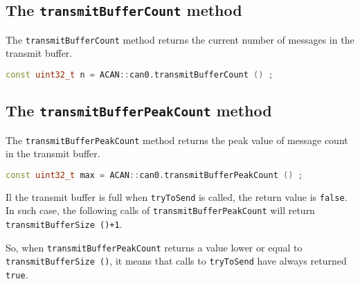 \documentclass[10pt, a4paper, obeyspaces, openany]{extarticle}
\begin{document}
\subsection{The \texttt{transmitBufferCount} method}

The \texttt{transmitBufferCount} method returns the current number of messages in the transmit buffer.
{ \small\begin{lstlisting}[language=c++]
const uint32_t n = ACAN::can0.transmitBufferCount () ;
\end{lstlisting}}


\subsection{The \texttt{transmitBufferPeakCount} method}

The \texttt{transmitBufferPeakCount} method returns the peak value of message count in the transmit buffer.
{ \small\begin{lstlisting}[language=c++]
const uint32_t max = ACAN::can0.transmitBufferPeakCount () ;
\end{lstlisting}}

Il the transmit buffer is full when \texttt{tryToSend} is called, the return value is \texttt{false}. In such case, the following calls of \texttt{transmitBufferPeakCount} will return \texttt{transmitBufferSize ()+1}. 

So, when \texttt{transmitBufferPeakCount} returns a value lower or equal to \texttt{transmitBufferSize ()}, it means that calls to \texttt{tryToSend} have always returned \texttt{true}.







%
%
%
%
\end{document}
